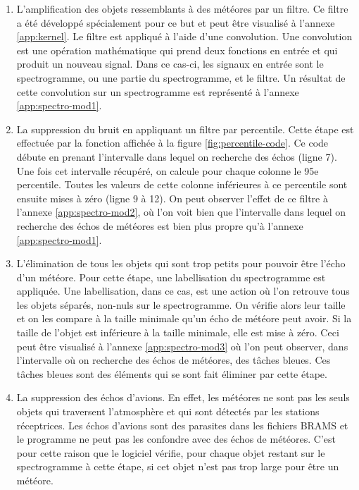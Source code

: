 \documentclass[11pt]{article}
\begin{document}
\begin{enumerate}
    \item L'amplification des objets ressemblants à des météores par un filtre.
          Ce filtre a été développé spécialement pour ce but et peut être visualisé à l'annexe \ref{app:kernel}.
          Le filtre est appliqué à l'aide d'une convolution.
          Une convolution est une opération mathématique qui prend deux fonctions en entrée et qui produit un nouveau signal.
          Dans ce cas-ci, les signaux en entrée sont le spectrogramme, ou une partie du spectrogramme, et le filtre.
          Un résultat de cette convolution sur un spectrogramme est représenté à l'annexe \ref{app:spectro-mod1}.
    \item La suppression du bruit en appliquant un filtre par percentile.
          Cette étape est effectuée par la fonction affichée à la figure \ref{fig:percentile-code}.
          Ce code débute en prenant l'intervalle dans lequel on recherche des échos (ligne 7).
          Une fois cet intervalle récupéré, on calcule pour chaque colonne le 95e percentile.
          Toutes les valeurs de cette colonne inférieures à ce percentile sont ensuite mises à zéro (ligne 9 à 12).
          On peut observer l'effet de ce filtre à l'annexe \ref{app:spectro-mod2}, où l'on voit bien que l'intervalle dans lequel on recherche des échos de météores est bien plus propre qu'à l'annexe \ref{app:spectro-mod1}.
    \item L'élimination de tous les objets qui sont trop petits pour pouvoir être l'écho d'un météore.
          Pour cette étape, une labellisation du spectrogramme est appliquée.
          Une labellisation, dans ce cas, est une action où l'on retrouve tous les objets séparés, non-nuls sur le spectrogramme.
          On vérifie alors leur taille et on les compare à la taille minimale qu'un écho de météore peut avoir.
          Si la taille de l'objet est inférieure à la taille minimale, elle est mise à zéro.
          Ceci peut être visualisé à l'annexe \ref{app:spectro-mod3} où l'on peut observer, dans l'intervalle où on recherche des échos de météores, des tâches bleues.
          Ces tâches bleues sont des éléments qui se sont fait éliminer par cette étape.
    \item La suppression des échos d'avions.
          En effet, les météores ne sont pas les seuls objets qui traversent l'atmosphère et qui sont détectés par les stations réceptrices.
          Les échos d'avions sont des parasites dans les fichiers BRAMS et le programme ne peut pas les confondre avec des échos de météores.
          C'est pour cette raison que le logiciel vérifie, pour chaque objet restant sur le spectrogramme à cette étape, si cet objet n'est pas trop large pour être un météore.
\end{enumerate}
\end{document}
